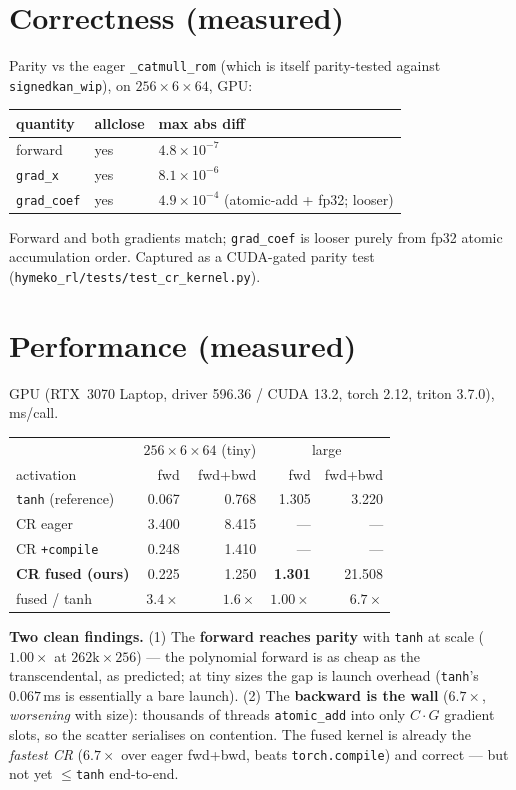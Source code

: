 \documentclass[11pt]{article}
\newcommand{\code}[1]{\texttt{\small #1}}
\begin{document}
\section{Correctness (measured)}
Parity vs the eager \code{\_catmull\_rom} (which is itself parity-tested against \code{signedkan\_wip}), on
$256{\times}6{\times}64$, GPU:
\begin{center}\small
\begin{tabular}{lll}
\toprule
quantity & allclose & max abs diff \\
\midrule
forward & yes & $4.8\times10^{-7}$ \\
\code{grad\_x} & yes & $8.1\times10^{-6}$ \\
\code{grad\_coef} & yes & $4.9\times10^{-4}$ \quad(atomic-add + fp32; looser) \\
\bottomrule
\end{tabular}
\end{center}
Forward and both gradients match; \code{grad\_coef} is looser purely from fp32 atomic accumulation order.
Captured as a CUDA-gated parity test (\code{hymeko\_rl/tests/test\_cr\_kernel.py}).

\section{Performance (measured)}
GPU (RTX~3070 Laptop, driver 596.36 / CUDA 13.2, torch 2.12, triton 3.7.0), ms/call.
\begin{center}\small
\begin{tabular}{lrr rr}
\toprule
 & \multicolumn{2}{c}{$256{\times}6{\times}64$ (tiny)} & \multicolumn{2}{c}{large} \\
activation & fwd & fwd+bwd & fwd & fwd+bwd \\
\midrule
\code{tanh} (reference) & 0.067 & 0.768 & 1.305 & 3.220 \\
CR eager & 3.400 & 8.415 & --- & --- \\
CR \code{+compile} & 0.248 & 1.410 & --- & --- \\
\textbf{CR fused (ours)} & 0.225 & 1.250 & \textbf{1.301} & 21.508 \\
\midrule
fused / tanh & $3.4\times$ & $1.6\times$ & $\mathbf{1.00\times}$ & $6.7\times$ \\
\bottomrule
\end{tabular}
\end{center}
\textbf{Two clean findings.} (1) The \textbf{forward reaches parity} with \code{tanh} at scale ($1.00\times$ at
$262\text{k}\times256$) --- the polynomial forward is as cheap as the transcendental, as predicted; at tiny
sizes the gap is launch overhead (\code{tanh}'s $0.067$\,ms is essentially a bare launch). (2) The
\textbf{backward is the wall} ($6.7\times$, \emph{worsening} with size): thousands of threads
\code{atomic\_add} into only $C\cdot G$ gradient slots, so the scatter serialises on contention. The fused
kernel is already the \emph{fastest CR} ($6.7\times$ over eager fwd+bwd, beats \code{torch.compile}) and
correct --- but not yet $\le$\code{tanh} end-to-end.
\end{document}
